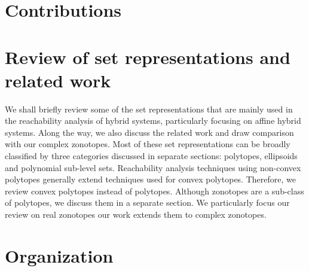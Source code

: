 

\section{Contributions}


\section{Review of set representations and related work}
We shall briefly review some of the set representations that are
mainly used in the reachability analysis of hybrid systems,
particularly focusing on affine hybrid systems.  Along the way, we
also discuss the related work and draw comparison with our complex
zonotopes.  Most of these set representations can be broadly
classified by three categories discussed in separate sections:
polytopes, ellipsoids and polynomial sub-level sets.  Reachability
analysis techniques using non-convex polytopes generally extend
techniques used for convex polytopes.  Therefore, we review convex
polytopes instead of polytopes.  Although zonotopes are a sub-class of
polytopes, we discuss them in a separate section.  We particularly
focus our review on real zonotopes our work extends them to complex
zonotopes.
%


\section{Organization}


